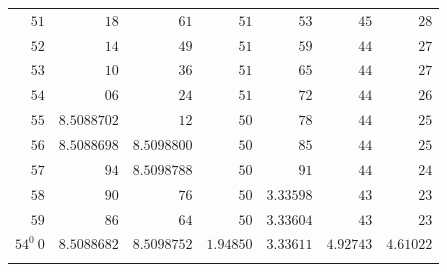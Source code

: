 \begin{center}
\begin{tabular}{||r||r|r|r|r|r|r||}
\(51\) & \(18\) & \(61\) & \(51\) & \(53\) & \(45\) & \(28\)\\
\(52\) & \(14\) & \(49\) & \(51\) & \(59\) & \(44\) & \(27\)\\
\(53\) & \(10\) & \(36\) & \(51\) & \(65\) & \(44\) & \(27\)\\
\(54\) & \(06\) & \(24\) & \(51\) & \(72\) & \(44\) & \(26\)\\
\(55\) & \(8.5088702\) & \(12\) & \(50\) & \(78\) & \(44\) & \(25\)\\
\(56\) & \(8.5088698\) & \(8.5098800\) & \(50\) & \(85\) & \(44\) & \(25\)\\
\(57\) & \(94\) & \(8.5098788\) & \(50\) & \(91\) & \(44\) & \(24\)\\
\(58\) & \(90\) & \(76\) & \(50\) & \(3.33598\) & \(43\) & \(23\)\\
\(59\) & \(86\) & \(64\) & \(50\) & \(3.33604\) & \(43\) & \(23\)\\[3pt]
\(54^0\ 0\) & \(8.5088682\) & \(8.5098752\) & \(1.94850\) & \(3.33611\) & \(4.92743\) & \(4.61022\)\\
\multicolumn{7}{||c||}{\rule{0pt}{140pt}}\\
\hline\hline
\end{tabular}
\end{center}
\endgroup
\clearpage
